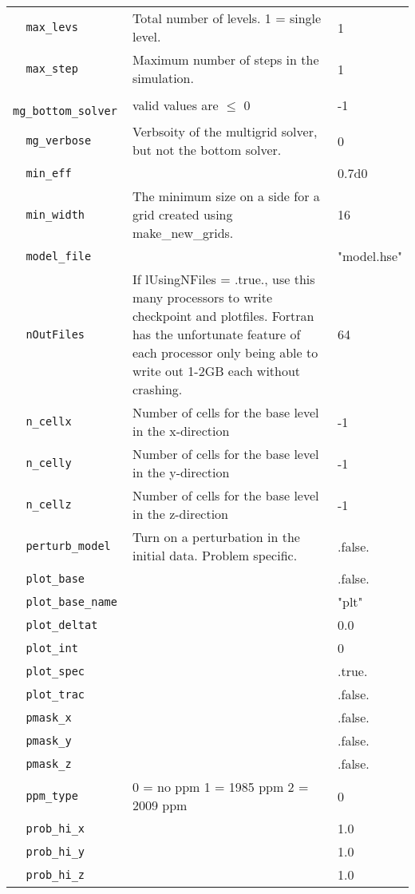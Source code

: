 {\begin{center}
\begin{longtable}{|l|p{3.25in}|l|}
\verb=  max_levs  = &   Total number of levels.  1 = single level.  &  1 \\
\verb=  max_step  = &   Maximum number of steps in the simulation.  &  1 \\
\verb=  mg_bottom_solver  = &   valid values are $\le$ 0  &  -1 \\
\verb=  mg_verbose  = &   Verbsoity of the multigrid solver, but not the bottom solver.  &  0 \\
\verb=  min_eff  = &    &  0.7d0 \\
\verb=  min_width  = &   The minimum size on a side for a grid created using make\_new\_grids.  &  16 \\
\verb=  model_file  = &    &  "model.hse" \\
\verb=  nOutFiles  = &   If lUsingNFiles = .true., use this many processors to write checkpoint and plotfiles.  Fortran has the unfortunate feature of each processor only being able to write out 1-2GB each without crashing.  &  64 \\
\verb=  n_cellx  = &   Number of cells for the base level in the x-direction  &  -1 \\
\verb=  n_celly  = &   Number of cells for the base level in the y-direction  &  -1 \\
\verb=  n_cellz  = &   Number of cells for the base level in the z-direction  &  -1 \\
\verb=  perturb_model  = &   Turn on a perturbation in the initial data.  Problem specific.  &  .false. \\
\verb=  plot_base  = &    &  .false. \\
\verb=  plot_base_name  = &    &  "plt" \\
\verb=  plot_deltat  = &    &  0.0 \\
\verb=  plot_int  = &    &  0 \\
\verb=  plot_spec  = &    &  .true. \\
\verb=  plot_trac  = &    &  .false. \\
\verb=  pmask_x  = &    &  .false. \\
\verb=  pmask_y  = &    &  .false. \\
\verb=  pmask_z  = &    &  .false. \\
\verb=  ppm_type  = &   0 = no ppm 1 = 1985 ppm 2 = 2009 ppm  &  0 \\
\verb=  prob_hi_x  = &    &  1.0 \\
\verb=  prob_hi_y  = &    &  1.0 \\
\verb=  prob_hi_z  = &    &  1.0 \\

\end{longtable}
\end{center}}
